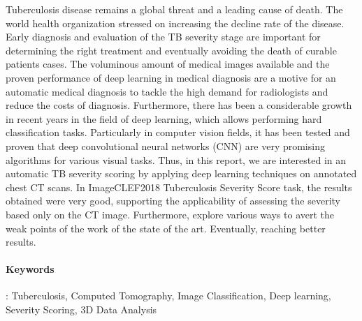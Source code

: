 Tuberculosis disease remains a global threat and a leading cause of death. The world health organization stressed on increasing the decline rate of the disease. Early diagnosis and evaluation of the TB severity stage are important for determining the right treatment and eventually avoiding the death of curable patients cases. The voluminous amount of medical images available and the proven performance of deep learning in medical diagnosis are a motive for an automatic medical diagnosis to tackle the high demand for radiologists and reduce the costs of diagnosis. Furthermore, there has been a considerable growth in recent years in the field of deep learning, which allows performing hard classification tasks.  Particularly in computer vision fields, it has been tested and proven that deep convolutional neural networks (CNN) are very promising algorithms for various visual tasks. Thus, in this report, we are interested in an automatic TB severity scoring by applying deep learning techniques on annotated chest CT scans. In ImageCLEF2018 Tuberculosis Severity Score task, the results obtained were very good, supporting the applicability of assessing the severity based only on the CT image. Furthermore, explore various ways to avert the weak points of the work of the state of the art. Eventually, reaching better results.
\paragraph{Keywords}: Tuberculosis, Computed Tomography, Image Classification, Deep learning, Severity Scoring, 3D Data Analysis